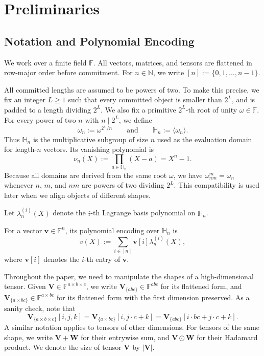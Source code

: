 \section{Preliminaries}\label{sec:background}

\subsection{Notation and Polynomial Encoding}\label{subsec:prelim-notation}

We work over a finite field $\mathbb{F}$. All vectors, matrices, and tensors are
flattened in row-major order before commitment. For $n \in \mathbb{N}$, we write
$[n] := \{0,1,\ldots,n-1\}$.

All committed lengths are assumed to be powers of two. To make this precise, we
fix an integer $L \ge 1$ such that every committed object is smaller than $2^L$,
and is padded to a length
dividing $2^L$. We also fix a primitive $2^L$-th root of unity $\omega \in
\mathbb{F}$. For every power of two $n$ with $n \mid 2^L$, we define
\[
\omega_n := \omega^{2^L/n}
\qquad\text{and}\qquad
\mathbb{H}_n := \langle \omega_n \rangle.
\]
Thus $\mathbb{H}_n$ is the multiplicative subgroup of size $n$ used as the
evaluation domain for length-$n$ vectors. Its vanishing polynomial is
\[
\nu_n(X) := \prod_{a \in \mathbb{H}_n}(X-a) = X^n-1.
\]
Because all domains are derived from the same root $\omega$, we have
$\omega_{nm}^m=\omega_n$ whenever $n$, $m$, and $nm$ are powers of two dividing
$2^L$. This compatibility is used later when we align objects of different
shapes.

Let $\lambda_n^{(i)}(X)$ denote the $i$-th Lagrange basis polynomial on
$\mathbb{H}_n$.

For a vector $\mathbf{v}\in\mathbb{F}^n$, its polynomial encoding over
$\mathbb{H}_n$ is
\[
v(X) := \sum_{i \in [n]} \mathbf{v}[i] \lambda_n^{(i)}(X),
\]
where $\mathbf{v}[i]$ denotes the $i$-th entry of $\mathbf{v}$.

Throughout the paper, we need to manipulate the shapes
of a high-dimensional tensor. Given $\mathbf{V}\in \mathbb{F}^{a\times b\times c}$,
we write $\mathbf{V}_{\{abc\}}\in \mathbb{F}^{abc}$ for its flattened form,
and $\mathbf{V}_{\{a\times bc\}}\in \mathbb{F}^{a\times bc}$ for its flattened form with the first dimension preserved.
As a sanity check, note that
\[
\mathbf{V}_{\{a\times b\times c\}}[i, j, k] = \mathbf{V}_{\{a\times bc\}}[i, j \cdot c + k] = \mathbf{V}_{\{abc\}}[i \cdot bc + j \cdot c + k].
\]
A similar notation applies to tensors of other dimensions.
For tensors of the same shape, we write $\mathbf{V}+\mathbf{W}$ for their entrywise sum, and
$\mathbf{V}\odot\mathbf{W}$ for their Hadamard product.
We denote the size of tensor $\mathbf{V}$ by $|\mathbf{V}|$.

